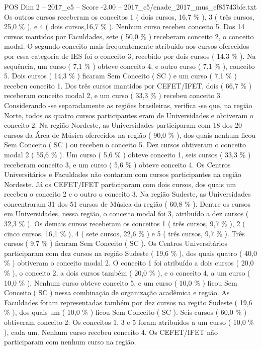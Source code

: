 \begin{textsample}{POS Dim 2 – 2017\_c5 – Score -2.00 – 2017\_c5/enade\_2017\_mus\_ef85743bfe.txt}
Os outros cursos receberam os conceitos 1 ( dois cursos, 16,7 \% ), 3 ( três cursos, 25,0 \% ), e 4 ( dois cursos,16,7 \% ).
Nenhum curso recebeu conceito 5.
Dos 14 cursos mantidos por Faculdades, sete ( 50,0 \% ) receberam conceito 2, o conceito modal.
O segundo conceito mais frequentemente atribuído aos cursos oferecidos por essa categoria de IES foi o conceito 3, recebido por dois cursos ( 14,3 \% ).
Na sequência, um curso ( 7,1 \% ) obteve conceito 4, e outro curso ( 7,1 \% ), conceito 5.
Dois cursos ( 14,3 \% ) ficaram Sem Conceito ( SC ) e um curso ( 7,1 \% ) recebeu conceito 1.
Dos três cursos mantidos por CEFET/IFET, dois ( 66,7 \% ) receberam conceito modal 2, e um curso ( 33,3 \% ) recebeu conceito 3.
Considerando -se separadamente as regiões brasileiras, verifica -se que, na região Norte, todos os quatro cursos participantes eram de Universidades e obtiveram o conceito 2.
Na região Nordeste, as Universidades participaram com 18 dos 20 cursos da Área de Música oferecidos na região ( 90,0 \% ), dos quais nenhum ficou Sem Conceito ( SC ) ou recebeu o conceito 5.
Dez cursos obtiveram o conceito modal 2 ( 55,6 \% ).
Um curso ( 5,6 \% ) obteve conceito 1, seis cursos ( 33,3 \% ) receberam conceito 3, e um curso ( 5,6 \% ) obteve conceito 4.
Os Centros Universitários e Faculdades não contaram com cursos participantes na região Nordeste.
Já os CEFET/IFET participaram com dois cursos, dos quais um recebeu o conceito 2 e o outro o conceito 3.
Na região Sudeste, as Universidades concentraram 31 dos 51 cursos de Música da região ( 60,8 \% ).
Dentre os cursos em Universidades, nessa região, o conceito modal foi 3, atribuído a dez cursos ( 32,3 \% ).
Os demais cursos receberam os conceitos 1 ( três cursos, 9,7 \% ), 2 ( cinco cursos, 16,1 \% ), 4 ( sete cursos, 22,6 \% ) e 5 ( três cursos, 9,7 \% ).
Três cursos ( 9,7 \% ) ficaram Sem Conceito ( SC ).
Os Centros Universitários participaram com dez cursos na região Sudeste ( 19,6 \% ), dos quais quatro ( 40,0 \% ) obtiveram o conceito modal 2.
O conceito 1 foi atribuído a dois cursos ( 20,0 \% ), o conceito 2, a dois cursos também ( 20,0 \% ), e o conceito 4, a um curso ( 10,0 \% ).
Nenhum curso obteve conceito 5, e um curso ( 10,0 \% ) ficou Sem Conceito ( SC ) nessa combinação de organização acadêmica e região.
As Faculdades foram representadas também por dez cursos na região Sudeste ( 19,6 \% ), dos quais um ( 10,0 \% ) ficou Sem Conceito ( SC ).
Seis cursos ( 60,0 \% ) obtiveram conceito 2.
Os conceitos 1, 3 e 5 foram atribuídos a um curso ( 10,0 \% ), cada um.
Nenhum curso recebeu conceito 4.
Os CEFET/IFET não participaram com nenhum curso na região.

\end{textsample}

